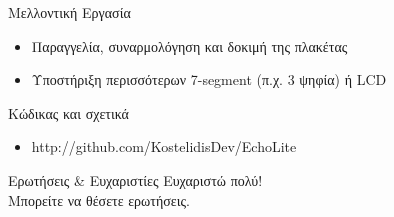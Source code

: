 \documentclass{beamer}
\begin{document}
\begin{frame}{Μελλοντική Εργασία}
\begin{itemize}
  \item Παραγγελία, συναρμολόγηση και δοκιμή της πλακέτας
  \item Υποστήριξη περισσότερων 7-segment (π.χ. 3 ψηφία) ή LCD
\end{itemize}
\end{frame}

\begin{frame}{Κώδικας και σχετικά}
\centering
\begin{itemize}
  \item http://github.com/KostelidisDev/EchoLite
\end{itemize}
\end{frame}

\begin{frame}{Ερωτήσεις \& Ευχαριστίες}
\centering
Ευχαριστώ πολύ! \\ Μπορείτε να θέσετε ερωτήσεις.
\end{frame}
\end{document}
